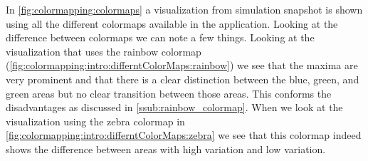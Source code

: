 In \cref{fig:colormapping:colormaps} a visualization from simulation snapshot is shown using all the different colormaps available in the application. Looking at the difference between colormaps we can note a few things. Looking at the visualization that uses the rainbow colormap (\cref{fig:colormapping:intro:differntColorMaps:rainbow}) we see that the maxima are very prominent and that there is a clear distinction between the blue, green, and green areas but no clear transition between those areas. This conforms the disadvantages as discussed in \cref{ssub:rainbow_colormap}.  When we look at the visualization using the zebra colormap in \cref{fig:colormapping:intro:differntColorMaps:zebra} we see that this colormap indeed shows the difference between areas with high variation and low variation. 


